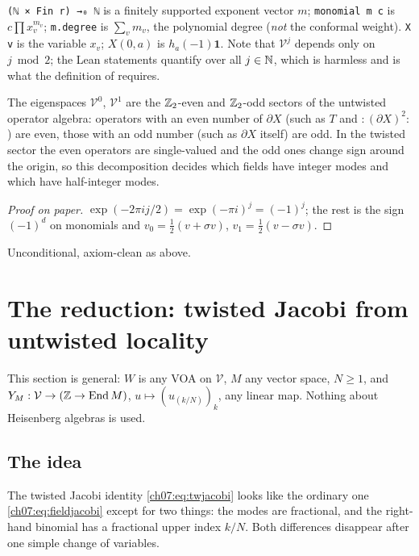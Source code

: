 \begin{dictionary}
\verb|(ℕ × Fin r) →₀ ℕ| is a finitely supported exponent vector $m$; \verb|monomial m c| is
$c\prod x_v^{m_v}$; \verb|m.degree| is $\sum_v m_v$, the polynomial degree (\emph{not} the
conformal weight). \verb|X v| is the variable $x_v$; $X(0,a)$ is $h_a(-1)\mathbf 1$. Note that
$\mathcal V^j$ depends only on $j\bmod 2$; the Lean statements quantify over all $j\in{\mathbb{N}}$, which
is harmless and is what the definition of  requires.
\end{dictionary}

\begin{physics}
The eigenspaces $\mathcal V^0$, $\mathcal V^1$ are the ${\mathbb{Z}}_2$-even and ${\mathbb{Z}}_2$-odd sectors of the untwisted operator algebra: operators with an even number of $\partial X$ (such as $T$ and ${:}(\partial X)^2{:}$) are even, those with an odd number (such as $\partial X$ itself) are odd. In the twisted sector the even operators are single-valued and the odd ones change sign around the origin, so this decomposition decides which fields have integer modes and which have half-integer modes.
\end{physics}

\begin{proof}[Proof on paper]
$\exp(-2\pi i j/2) = \exp(-\pi i)^j = (-1)^j$; the rest is the sign $(-1)^d$ on monomials and
$v_0 = \frac12(v+\sigma v)$, $v_1 = \frac12(v-\sigma v)$.
\end{proof}

\begin{status}
Unconditional, axiom-clean as above.
\end{status}

\section{The reduction: twisted Jacobi from untwisted locality}\label{ch07:sec:reduction}

This section is general: $W$ is any VOA on $\mathcal V$, $M$ any vector space, $N\ge1$, and
$Y_M : \mathcal V\to({\mathbb{Z}}\to\operatorname{End} M)$, $u\mapsto(u_{(k/N)})_k$, any linear map. Nothing about
Heisenberg algebras is used.

\subsection{The idea}\label{ch07:sec:redidea}

The twisted Jacobi identity \eqref{ch07:eq:twjacobi} looks like the ordinary one
\eqref{ch07:eq:fieldjacobi} except for two things: the modes are fractional, and the right-hand
binomial has a fractional upper index $k/N$. Both differences disappear after one simple change
of variables.

